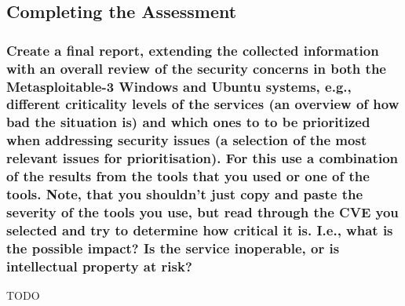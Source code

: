 \subsection{Completing the Assessment}
\subsubsection{Create a final report, extending the collected information with an overall review of the security concerns in both the Metasploitable-3 Windows and Ubuntu systems, e.g., different criticality levels of the services (an overview of how bad the situation is) and which ones to to be prioritized when addressing security issues (a selection of the most relevant issues for prioritisation). For this use a combination of the results from the tools that you used or one of the tools. Note, that you shouldn’t just copy and paste the severity of the tools you use, but read through the CVE you selected and try to determine how critical it is. I.e., what is the possible impact? Is the service inoperable, or is intellectual property at risk?}
TODO